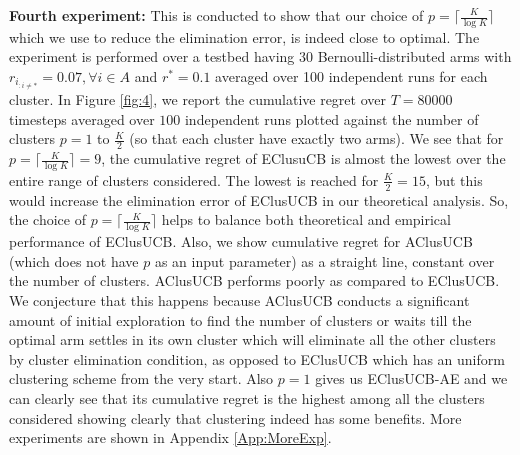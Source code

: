 \textbf{Fourth experiment:} This is conducted to show that our choice of $p=\lceil\frac{K}{\log K}\rceil$ which we use to reduce the elimination error, is indeed close to optimal. The experiment is performed over a testbed having $30$ Bernoulli-distributed arms with $r_{i_{:{{i}\neq {*}}}}=0.07,\forall i\in A$ and $r^{*}=0.1$ averaged over 100 independent runs for each cluster. In Figure \ref{fig:4}, we report the cumulative regret over $T=80000$ timesteps averaged over $100$ independent runs plotted against the number of clusters $p=1$ to $\frac{K}{2}$ (so that each cluster have exactly two arms). We see that for $p=\lceil\frac{K}{\log K}\rceil=9$, the cumulative regret of EClusuCB is almost the lowest over the entire range of clusters considered. The lowest is reached for $\frac{K}{2}=15$, but this would increase the elimination error of EClusUCB in our theoretical analysis. So, the choice of $p=\lceil\frac{K}{\log K}\rceil$ helps to balance both theoretical and empirical performance of EClusUCB. Also, we show cumulative regret for AClusUCB (which does not have $p$ as an input parameter) as a straight line, constant over the number of clusters. AClusUCB  performs poorly as compared to EClusUCB. We conjecture that this happens because AClusUCB conducts a significant amount of initial exploration to find the number of clusters or waits till the optimal arm settles in its own cluster which will eliminate all the other clusters by cluster elimination condition, as opposed to EClusUCB which has an uniform clustering scheme from the very start. Also $p=1$ gives us EClusUCB-AE and we can clearly see that its cumulative regret is the highest among all the clusters considered showing clearly that clustering indeed has some benefits. More experiments are shown in Appendix \ref{App:MoreExp}.




